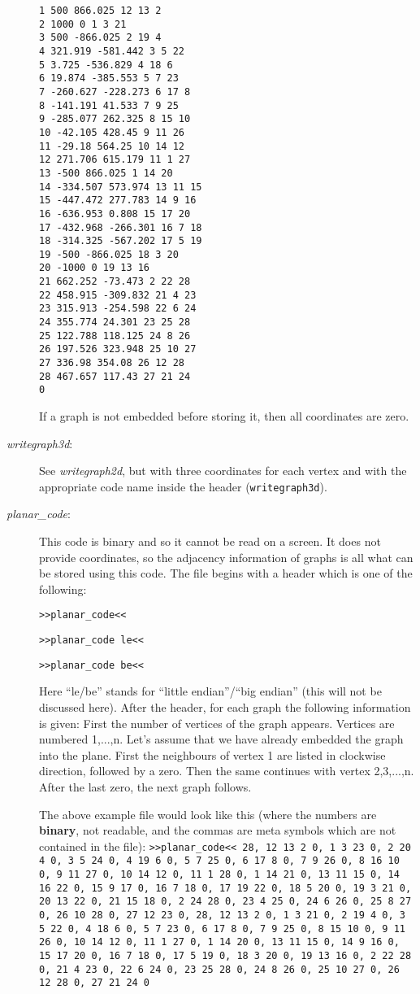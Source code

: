 \documentclass[a4paper]{article}
\begin{document}
\begin{description}
\begin{verbatim}
1 500 866.025 12 13 2
2 1000 0 1 3 21
3 500 -866.025 2 19 4
4 321.919 -581.442 3 5 22
5 3.725 -536.829 4 18 6
6 19.874 -385.553 5 7 23
7 -260.627 -228.273 6 17 8
8 -141.191 41.533 7 9 25
9 -285.077 262.325 8 15 10
10 -42.105 428.45 9 11 26
11 -29.18 564.25 10 14 12
12 271.706 615.179 11 1 27
13 -500 866.025 1 14 20
14 -334.507 573.974 13 11 15
15 -447.472 277.783 14 9 16
16 -636.953 0.808 15 17 20
17 -432.968 -266.301 16 7 18
18 -314.325 -567.202 17 5 19
19 -500 -866.025 18 3 20
20 -1000 0 19 13 16
21 662.252 -73.473 2 22 28
22 458.915 -309.832 21 4 23
23 315.913 -254.598 22 6 24
24 355.774 24.301 23 25 28
25 122.788 118.125 24 8 26
26 197.526 323.948 25 10 27
27 336.98 354.08 26 12 28
28 467.657 117.43 27 21 24
0
\end{verbatim}
If a graph is not embedded before storing it, then all coordinates are zero.
\item[\textit{writegraph3d}:] See \textit{writegraph2d}, 
  but with three coordinates for each vertex and with the appropriate code
  name inside the header (\texttt{writegraph3d}). 
\item[\textit{planar\_code}:]
   This code is binary and so it cannot be read on a screen.  It does not
   provide coordinates, so the adjacency information of graphs is all what
   can be stored using this code. 
   The file begins with a header which is one of the following:   
\begin{center}
   \texttt{>>planar\_code<<}
  
   \texttt{>>planar\_code le<<}
  
   \texttt{>>planar\_code be<<}
\end{center}
   Here ``le/be'' stands for ``little endian''/``big endian'' (this will not be
   discussed here). After the header, for each graph the following information
   is given: First the number
   of vertices of the graph appears. Vertices are numbered 1,...,n. Let's
   assume that we have already embedded the graph into the plane. First 
   the neighbours of vertex 1 are listed in clockwise direction, followed by a
   zero. Then the same continues with vertex 2,3,...,n. After the last zero,
   the next graph follows.
   
   The above example file would look like this 
   (where the numbers are \textbf{binary}, not readable, and the commas are
   meta symbols which are not contained in the file):
 \texttt{>>planar\_code<< 28, 12 13 2 0,
1 3 23 0,
2 20 4 0,
3 5 24 0,
4 19 6 0,
5 7 25 0,
6 17 8 0,
7 9 26 0,
8 16 10 0, 
9 11 27 0,
10 14 12 0,
11 1 28 0,
1 14 21 0,
13 11 15 0,
14 16 22 0,
15 9 17 0,
16 7 18 0,
17 19 22 0,
18 5 20 0,
19 3 21 0,
20 13 22 0,
21 15 18 0,
2 24 28 0,
23 4 25 0,
24 6 26 0,
25 8 27 0,
26 10 28 0,
27 12 23 0,
28,
12 13 2 0,
1 3 21 0,
2 19 4 0,
3 5 22 0,
4 18 6 0,
5 7 23 0,
6 17 8 0,
7 9 25 0,
8 15 10 0,
9 11 26 0,
10 14 12 0,
11 1 27 0,
1 14 20 0,
13 11 15 0,
14 9 16 0,
15 17 20 0,
16 7 18 0,
17 5 19 0,
18 3 20 0,
19 13 16 0,
2 22 28 0,
21 4 23 0,
22 6 24 0,
23 25 28 0,
24 8 26 0,
25 10 27 0,
26 12 28 0,
27 21 24 0}


\end{description}
\end{document}
